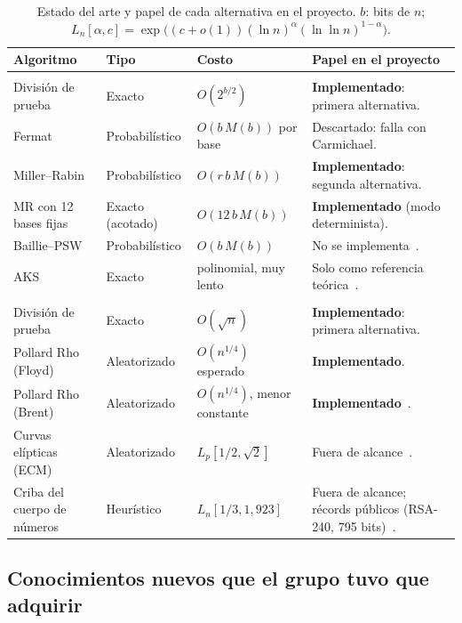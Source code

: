\begin{table}[H]
\centering\small
\caption{Estado del arte y papel de cada alternativa en el proyecto. $b$: bits de $n$;
$L_n[\alpha, c] = \exp\!\big((c+o(1))(\ln n)^\alpha(\ln\ln n)^{1-\alpha}\big)$.}
\label{tab:estado-arte}
\begin{tabularx}{\textwidth}{@{}>{\raggedright}p{3.4cm} >{\raggedright}p{2.2cm} >{\raggedright}p{3.0cm} Y@{}}
\toprule
\textbf{Algoritmo} & \textbf{Tipo} & \textbf{Costo} & \textbf{Papel en el proyecto}\\
\midrule
{}\\
División de prueba & Exacto & $O(2^{b/2})$ & \textbf{Implementado}: primera alternativa.\\
Fermat & Probabilístico & $O(b\,M(b))$ por base & Descartado: falla con Carmichael.\\
Miller--Rabin & Probabilístico & $O(r\,b\,M(b))$ & \textbf{Implementado}: segunda alternativa.\\
MR con 12 bases fijas & Exacto (acotado) & $O(12\,b\,M(b))$ & \textbf{Implementado} (modo determinista).\\
Baillie--PSW & Probabilístico & $O(b\,M(b))$ & No se implementa~\cite{bw1980}.\\
AKS & Exacto & polinomial, muy lento & Solo como referencia teórica~\cite{aks2004}.\\
\midrule
{}\\
División de prueba & Exacto & $O(\sqrt n)$ & \textbf{Implementado}: primera alternativa.\\
Pollard Rho (Floyd) & Aleatorizado & $O(n^{1/4})$ esperado & \textbf{Implementado}.\\
Pollard Rho (Brent) & Aleatorizado & $O(n^{1/4})$, menor constante & \textbf{Implementado}~\cite{brent1980}.\\
Curvas elípticas (ECM) & Aleatorizado & $L_p[1/2, \sqrt 2]$ & Fuera de alcance~\cite{lenstra1987}.\\
Criba del cuerpo de números & Heurístico & $L_n[1/3, 1{,}923]$ & Fuera de alcance; récords públicos (RSA-240, 795 bits)~\cite{boudot2020}.\\
\bottomrule
\end{tabularx}
\end{table}

\subsection{Conocimientos nuevos que el grupo tuvo que adquirir}


